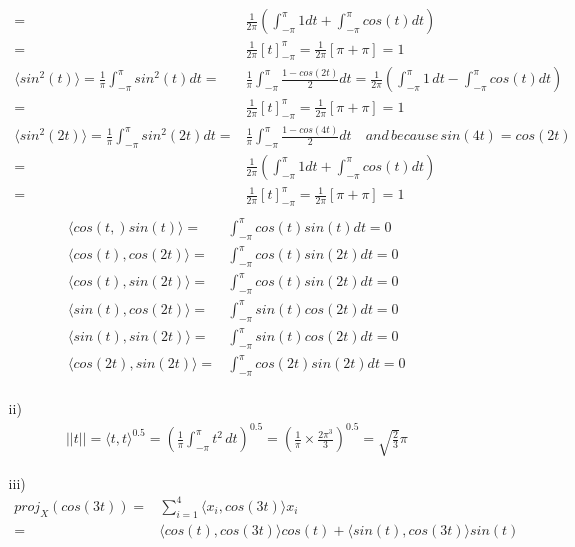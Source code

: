 \documentclass[letterpaper,12pt]{article}
\theoremstyle{definition}
\begin{document}
\begin{enumerate}
\begin{itemize}
\begin{align*}
=&\frac{1}{2\pi} \left( \int_{-\pi}^{\pi}1dt + \int_{-\pi}^{\pi} cos(t)dt \right)\\
=& \frac{1}{2\pi} \left[ t \right]_{-\pi}^{\pi} = \frac{1}{2\pi} [\pi + \pi] = 1 \\
\langle sin^2(t) \rangle = \frac{1}{\pi} \int_{-\pi}^{\pi} sin^2(t)dt =& \frac{1}{\pi} \int_{-\pi}^{\pi} \frac{1-cos(2t)}{2} dt = \frac{1}{2\pi} \left( \int_{-\pi}^{\pi}1\, dt - \int_{-\pi}^{\pi} cos(t)dt \right)\\
=& \frac{1}{2\pi} \left[ t \right]_{-\pi}^{\pi} = \frac{1}{2\pi} [\pi + \pi] = 1 \\
\langle sin^2(2t) \rangle = \frac{1}{\pi} \int_{-\pi}^{\pi} sin^2(2t)dt =& \frac{1}{\pi} \int_{-\pi}^{\pi} \frac{1-cos(4t)}{2} dt  \quad and \, because \, sin(4t)=cos(2t)\\
=&\frac{1}{2\pi} \left( \int_{-\pi}^{\pi}1dt + \int_{-\pi}^{\pi} cos(t)dt \right)\\
=& \frac{1}{2\pi} \left[ t \right]_{-\pi}^{\pi} = \frac{1}{2\pi} [\pi + \pi] = 1 \\
\end{align*}
\begin{align*}
\langle cos(t,)sin(t) \rangle  =& \int_{-\pi}^{\pi}cos(t)sin(t) dt = 0 \\
\langle cos(t), cos(2t)\rangle  =& \int_{-\pi}^{\pi}cos(t) sin(2t) dt = 0 \\
\langle cos(t), sin(2t) \rangle =& \int_{-\pi}^{\pi} cos(t) sin(2t) dt = 0 \\
\langle sin(t) ,cos(2t)\rangle =& \int_{-\pi}^{\pi}sin(t) cos(2t) dt = 0 \\
\langle sin(t) ,sin(2t)\rangle =& \int_{-\pi}^{\pi}sin(t) cos(2t) dt = 0 \\
\langle cos(2t),sin(2t) \rangle  =& \int_{-\pi}^{\pi}cos(2t) sin(2t) dt = 0 \\
\end{align*}
\item[ii)]
\begin{align*}
||t|| = \langle t,t \rangle^{0.5}= \left( \frac{1}{\pi}\int_{-\pi}^{\pi} t^2 \, dt \right)^{0.5}= \left(\frac{1}{\pi} \times \frac{2 \pi^3}{3} \right)^{0.5} = \sqrt{\frac{2}{3}} \pi
\end{align*}
\item[iii)]
\begin{align*}
proj_X(cos(3t)) =& \sum_{i=1}^4 \langle x_i, cos(3t)\rangle x_i \\
 =& \langle cos(t), cos(3t)\rangle cos(t) + \langle sin(t), cos(3t)\rangle sin(t) \\

\end{align*}
\end{itemize}
\end{enumerate}
\end{document}
